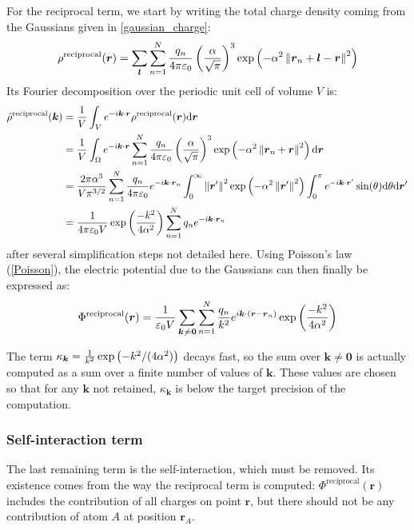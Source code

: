 \documentclass[main.tex]{subfiles}
\begin{document}
For the reciprocal term, we start by writing the total charge density coming from the Gaussians given in \cref{gaussian_charge}:
\[\rho^\text{reciprocal}(\boldsymbol r) = \sum_{\boldsymbol l}\sum_{n=1}^N \frac{q_n}{4\pi\varepsilon_0}\left(\frac\alpha{\sqrt\pi}\right)^3\exp\left(-\alpha^2\left\|\boldsymbol r_n + \boldsymbol l - \boldsymbol r\right\|^2\right)\]
Its Fourier decomposition over the periodic unit cell of volume $V$ is:
\[\begin{split}
\hat\rho^\text{reciprocal}(\boldsymbol k) &= \frac1V\int_V e^{-i\boldsymbol k\cdot\boldsymbol r} \rho^\text{reciprocal}(\boldsymbol r)\text d\boldsymbol r
\\&= \frac1V\int_\Omega e^{-i\boldsymbol k\cdot\boldsymbol r} \sum_{n=1}^N \frac{q_n}{4\pi\varepsilon_0} \left(\frac\alpha{\sqrt\pi}\right)^3\exp\left(-\alpha^2\left\|\boldsymbol r_n + \boldsymbol r\right\|^2\right) \text d\boldsymbol r
\\&= \frac{2\pi\alpha^3}{V\pi^{3/2}} \sum_{n=1}^N \frac{q_n}{4\pi\varepsilon_0} e^{-i\boldsymbol k\cdot\boldsymbol r_n} \int_0^\infty \left\|\boldsymbol{r}'\right\|^2\exp\left(-\alpha^2 \left\|\boldsymbol{r}'\right\|^2\right)\int_0^\pi e^{-i\boldsymbol k\cdot\boldsymbol{r}'} \sin(\theta) \text d \theta \text d \boldsymbol{r}'
\\&= \frac1{4\pi\varepsilon_0V}\exp\left(\frac{-k^2}{4\alpha^2}\right)\sum_{n=1}^N q_n e^{-i\boldsymbol k\cdot\boldsymbol r_n}\end{split}\]
after several simplification steps not detailed here. Using Poisson's law (\cref{Poisson}), the electric potential due to the Gaussians can then finally be expressed as:
\[\Phi^\text{reciprocal}(\boldsymbol r) = \frac{1}{\varepsilon_0V}\sum_{\boldsymbol k\not\kern0.2ex= \boldsymbol 0}\sum_{n=1}^N \frac{q_n}{k^2} e^{i\boldsymbol k\cdot\left(\boldsymbol r - \boldsymbol r_n\right)}\exp\left(\frac{-k^2}{4\alpha^2}\right)\label{eq:reciprocal}\]

The term $\kappa_{\boldsymbol{k}} = \frac1{k^2}\exp\left(-k^2/(4\alpha^2)\right)$ decays fast, so the sum over $\boldsymbol{k}\neq\boldsymbol{0}$ is actually computed as a sum over a finite number of values of $\boldsymbol{k}$. These values are chosen so that for any $\boldsymbol{k}$ not retained, $\kappa_{\boldsymbol{k}}$ is below the target precision of the computation.

\subsubsection{Self-interaction term}

The last remaining term is the self-interaction, which must be removed. Its existence comes from the way the reciprocal term is computed: $\Phi^\text{reciprocal}(\boldsymbol r)$ includes the contribution of all charges on point $\boldsymbol r$, but there should not be any contribution of atom $A$ at position $\boldsymbol r_A$.
\end{document}
